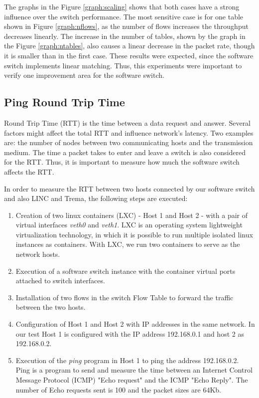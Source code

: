         The graphs in the Figure \ref{graph:scaling} shows that both cases have a strong influence over the switch performance. The most sensitive case is for one table shown in Figure \ref{graph:nflows}, as the number of flows increases the throughput decreases linearly. The increase in the number of tables, shown by the graph in the Figure \ref{graph:ntables}, also causes a linear decrease in the packet rate, though it is smaller than in the first case. These results were expected, since the software switch implements linear matching. Thus, this experiments were important to verify one improvement area for the software switch.     
     
    \subsection{Ping Round Trip Time}

    Round Trip Time (RTT) is the time between a data request and answer. Several factors might affect the total RTT and  influence network's latency. Two examples are: the number of nodes between two communicating hosts and the transmission medium. The time a packet takes to enter and leave a switch is also considered for the RTT. Thus, it is important to measure how much the software switch affects the RTT. 
    
    In order to measure the RTT between two hosts connected by our software switch and also LINC and Trema, the following steps are executed:
    
    \begin{enumerate}
    \item Creation of two linux containers (LXC) - Host 1 and Host 2 - with a pair of virtual interfaces \textit{veth0} and \textit{veth1}. LXC is an operating system lightweight virtualization technology, in which it is possible to run multiple isolated linux instances as containers. With LXC, we run two containers to serve as the network hosts.    
    \item Execution of a software switch instance with the container virtual ports attached to switch interfaces.
    \item Installation of two flows in the switch Flow Table to forward the traffic between the two hosts. 
    \item Configuration of Host 1 and Host 2 with IP addresses in the same network. In our test Host 1 is configured with the IP address 192.168.0.1 and host 2 as 192.168.0.2. 
    \item Execution of the \textit{ping} program in Host 1 to ping the address 192.168.0.2. Ping is a program to send and measure the time between an Internet Control Message Protocol (ICMP) "Echo request" and the ICMP "Echo Reply". The number of Echo requests sent is 100 and the packet sizes are 64Kb.
    \end{enumerate}

